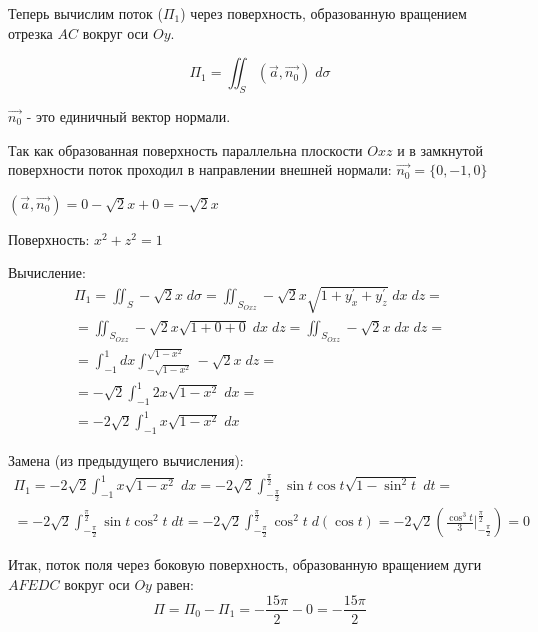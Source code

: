 \begin{enumerate}
    Теперь вычислим поток ($\Pi_{1}$) через поверхность, образованную вращением отрезка $AC$ вокруг оси $Oy$.

    \begin{equation*}
        \Pi_{1} = \iint_{S} (\Vec{a}, \Vec{n_{0}})\; d\sigma
    \end{equation*}

    $\Vec{n_{0}}$ - это единичный вектор нормали. 
    
    Так как образованная поверхность  параллельна плоскости $Oxz$ и в замкнутой поверхности поток проходил в направлении внешней нормали: $\Vec{n_{0}} = \{0,-1,0\}$

    $(\Vec{a}, \Vec{n_{0}}) = 0 - \sqrt{2}x + 0 = -\sqrt{2}x$

    Поверхность: $x^2 + z^2 = 1$

    Вычисление:
    \begin{align*}
        \Pi_{1} = \iint_{S} -\sqrt{2}x\; d\sigma = \iint_{S_{Oxz}} -\sqrt{2}x  \sqrt{1 + y_{x}^\prime + y_{z}^\prime}\; dx\;dz
        =\\=
        \iint_{S_{Oxz}} -\sqrt{2}x \sqrt{1 + 0 + 0}\; dx\;dz = \iint_{S_{Oxz}} -\sqrt{2}x \;dx\;dz 
        =\\=
        \int_{-1}^{1}dx\int_{-\sqrt{1-x^2}}^{\sqrt{1-x^2}} -\sqrt{2}x \;dz 
        =\\=
        -\sqrt{2}\int_{-1}^{1}2x\sqrt{1-x^2}\;dx
        =\\=
        -2\sqrt{2}\int_{-1}^{1}x\sqrt{1-x^2}\;dx
    \end{align*}

    Замена (из предыдущего вычисления):
    \begin{align*}
        \Pi_{1} = -2\sqrt{2}\int_{-1}^{1}x\sqrt{1-x^2}\;dx = -2\sqrt{2}\int_{-\frac{\pi}{2}}^{\frac{\pi}{2}}\sin{t}\cos{t}\sqrt{1-\sin^2{t}}\;dt 
        =\\=
        -2\sqrt{2}\int_{-\frac{\pi}{2}}^{\frac{\pi}{2}}\sin{t}\cos^2{t}\;dt
        = -2\sqrt{2}\int_{-\frac{\pi}{2}}^{\frac{\pi}{2}}\cos^2{t}\;d(\cos{t}) = -2\sqrt{2} \left(\frac{\cos^3{t}}{3}\biggr|_{-\frac{\pi}{2}}^{\frac{\pi}{2}} \right) = 0
    \end{align*}

    Итак, поток поля через боковую поверхность, образованную вращением дуги $AFEDC$ вокруг оси $Oy$ равен:
    \begin{equation*}
        \Pi = \Pi_{0} - \Pi_{1} = -\frac{15\pi}{2} - 0 = -\frac{15\pi}{2}
    \end{equation*}
\end{enumerate}
